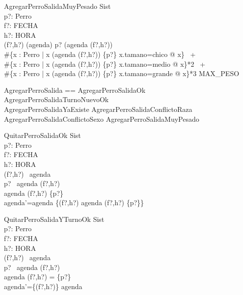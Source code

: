 \begin{schema}{AgregarPerroSalidaMuyPesado}
\Xi Sist \\
p?: Perro \\
f?: FECHA \\
h?: HORA \\
\where
(f?,h?) \in (\dom agenda) \land p? \notin (agenda (f?,h?)) \\
\#\{x : Perro | x \in (agenda (f?,h?)) \cup \{p?\} \land x.tamano=chico @ x\} \ + \\
\#\{x : Perro | x \in (agenda (f?,h?)) \cup \{p?\} \land x.tamano=medio @ x\}*2 \ + \\
\#\{x : Perro | x \in (agenda (f?,h?)) \cup \{p?\} \land x.tamano=grande @ x\}*3 \geq MAX\_PESO \\
\end{schema}

\begin{zed}
AgregarPerroSalida == AgregarPerroSalidaOk \lor AgregarPerroSalidaTurnoNuevoOk \lor \\ AgregarPerroSalidaYaExiste \lor AgregarPerroSalidaConflictoRaza \lor \\ AgregarPerroSalidaConflictoSexo  \lor AgregarPerroSalidaMuyPesado
\end{zed}

\begin{schema}{QuitarPerroSalidaOk}
\Delta Sist \\
p?: Perro \\
f?: FECHA \\
h?: HORA \\
\where
(f?,h?) \in \dom \ agenda \\
p? \in \ agenda (f?,h?) \\
agenda (f?,h?) \neq \{p?\} \\
agenda'=agenda \oplus \{(f?,h?) \mapsto agenda (f?,h?) \setminus \{p?\}\} \\
\end{schema}

\begin{schema}{QuitarPerroSalidaYTurnoOk}
\Delta Sist \\
p?: Perro \\
f?: FECHA \\
h?: HORA \\
\where
(f?,h?) \in \dom \ agenda \\
p? \in \ agenda (f?,h?) \\
agenda (f?,h?) = \{p?\} \\
agenda'=\{(f?,h?)\} \ndres agenda \\
\end{schema}

